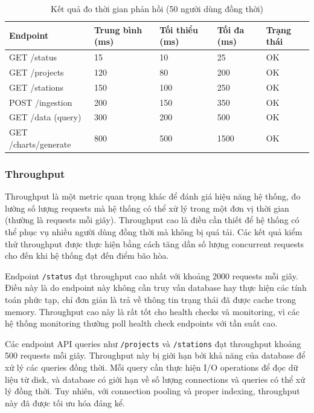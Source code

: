 \begin{table}[H]
\centering
\caption{Kết quả đo thời gian phản hồi (50 người dùng đồng thời)}
\label{tab:response-time}
\begin{tabular}{|p{4cm}|p{2.5cm}|p{2.5cm}|p{2.5cm}|p{2.5cm}|}
\hline
\textbf{Endpoint} & \textbf{Trung bình (ms)} & \textbf{Tối thiểu (ms)} & \textbf{Tối đa (ms)} & \textbf{Trạng thái} \\
\hline
GET /status & 15 & 10 & 25 & OK \\
\hline
GET /projects & 120 & 80 & 200 & OK \\
\hline
GET /stations & 150 & 100 & 250 & OK \\
\hline
POST /ingestion & 200 & 150 & 350 & OK \\
\hline
GET /data (query) & 300 & 200 & 500 & OK \\
\hline
GET /charts/generate & 800 & 500 & 1500 & OK \\
\hline
\end{tabular}
\end{table}

\subsubsection{Throughput}

Throughput là một metric quan trọng khác để đánh giá hiệu năng hệ thống, đo lường số lượng requests mà hệ thống có thể xử lý trong một đơn vị thời gian (thường là requests mỗi giây). Throughput cao là điều cần thiết để hệ thống có thể phục vụ nhiều người dùng đồng thời mà không bị quá tải. Các kết quả kiểm thử throughput được thực hiện bằng cách tăng dần số lượng concurrent requests cho đến khi hệ thống đạt đến điểm bão hòa.

Endpoint \texttt{/status} đạt throughput cao nhất với khoảng 2000 requests mỗi giây. Điều này là do endpoint này không cần truy vấn database hay thực hiện các tính toán phức tạp, chỉ đơn giản là trả về thông tin trạng thái đã được cache trong memory. Throughput cao này là rất tốt cho health checks và monitoring, vì các hệ thống monitoring thường poll health check endpoints với tần suất cao.

Các endpoint API queries như \texttt{/projects} và \texttt{/stations} đạt throughput khoảng 500 requests mỗi giây. Throughput này bị giới hạn bởi khả năng của database để xử lý các queries đồng thời. Mỗi query cần thực hiện I/O operations để đọc dữ liệu từ disk, và database có giới hạn về số lượng connections và queries có thể xử lý đồng thời. Tuy nhiên, với connection pooling và proper indexing, throughput này đã được tối ưu hóa đáng kể.

